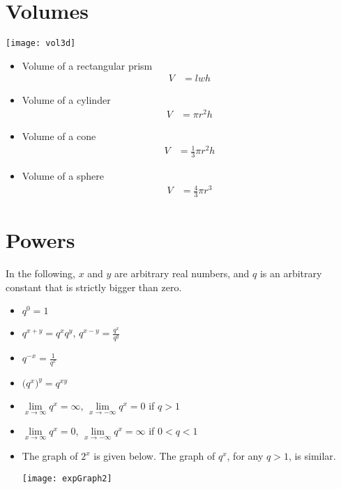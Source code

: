 \section{Volumes}\label{sec volumes}
\begin{center}
 \texttt{[image: vol3d]}
\end{center}
\begin{itemize}
 \item Volume of a rectangular prism
\begin{align*}
  V &= l w h
\end{align*}
 \item Volume of a cylinder
\begin{align*}
  V &= \pi r^2 h
\end{align*}
 \item Volume of a cone
\begin{align*}
  V &= \frac{1}{3} \pi r^2 h
\end{align*}

 \item Volume of a sphere
\begin{align*}
  V &= \frac{4}{3} \pi r^3
\end{align*}
\end{itemize}


\section{Powers}\label{sec powers}
In the following, $x$ and $y$ are arbitrary real numbers,
and $q$ is an arbitrary constant that is strictly bigger
than zero.
\begin{itemize}
 \item $q^0=1$

\item $q^{x+y}=q^xq^y$,
         $q^{x-y}=\frac{q^x}{q^y}$
\item $q^{-x}=\frac{1}{q^x}$
\item $\big(q^x\big)^y=q^{xy}$
\item  $\lim\limits_{x\rightarrow\infty}q^x=\infty$,
           $\lim\limits_{x\rightarrow-\infty}q^x=0$ if $q>1$
\item $\lim\limits_{x\rightarrow\infty}q^x=0$,
           $\lim\limits_{x\rightarrow-\infty}q^x=\infty$ if $0<q<1$
\item  The graph of $2^x$ is given below. The graph of  $q^x$,
for any $q>1$, is similar.

\begin{center}
\texttt{[image: expGraph2]}
\end{center}


\end{itemize}


